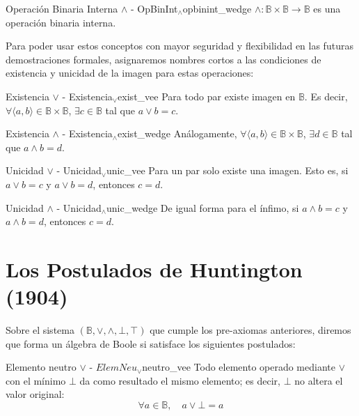 \begin{preaxioma}{Operación Binaria Interna $\wedge$ - OpBinInt$_\wedge$}{opbinint_wedge}
$\wedge : \mathbb{B} \times \mathbb{B} \to \mathbb{B}$ es una operación binaria interna.
\end{preaxioma}

Para poder usar estos conceptos con mayor seguridad y flexibilidad en las futuras demostraciones formales, asignaremos nombres cortos a las condiciones de existencia y unicidad de la imagen para estas operaciones:

\begin{preaxioma}{Existencia $\vee$ - Existencia$_\vee$}{exist_vee}
Para todo par existe imagen en $\mathbb{B}$. Es decir, $\forall \langle a,b \rangle \in \mathbb{B} \times \mathbb{B}$, $\exists c \in \mathbb{B}$ tal que $a \vee b = c$.
\end{preaxioma}

\begin{preaxioma}{Existencia $\wedge$ - Existencia$_\wedge$}{exist_wedge}
Análogamente, $\forall \langle a,b \rangle \in \mathbb{B} \times \mathbb{B}$, $\exists d \in \mathbb{B}$ tal que $a \wedge b = d$.
\end{preaxioma}

\begin{preaxioma}{Unicidad $\vee$ - Unicidad$_\vee$}{unic_vee}
Para un par solo existe una imagen. Esto es, si $a \vee b = c$ y $a \vee b = d$, entonces $c = d$.
\end{preaxioma}

\begin{preaxioma}{Unicidad $\wedge$ - Unicidad$_\wedge$}{unic_wedge}
De igual forma para el ínfimo, si $a \wedge b = c$ y $a \wedge b = d$, entonces $c = d$.
\end{preaxioma}

\section{Los Postulados de Huntington (1904)}
Sobre el sistema $(\mathbb{B}, \vee, \wedge, \bot, \top)$ que cumple los pre-axiomas anteriores, diremos que forma un álgebra de Boole si satisface los siguientes postulados:

\begin{postulado}{Elemento neutro $\vee$ - $ElemNeu_\vee$}{neutro_vee}
Todo elemento operado mediante $\vee$ con el mínimo $\bot$ da como resultado el mismo elemento; es decir, $\bot$ no altera el valor original:
\[ \forall a \in \mathbb{B}, \quad a \vee \bot = a \]
\end{postulado}

